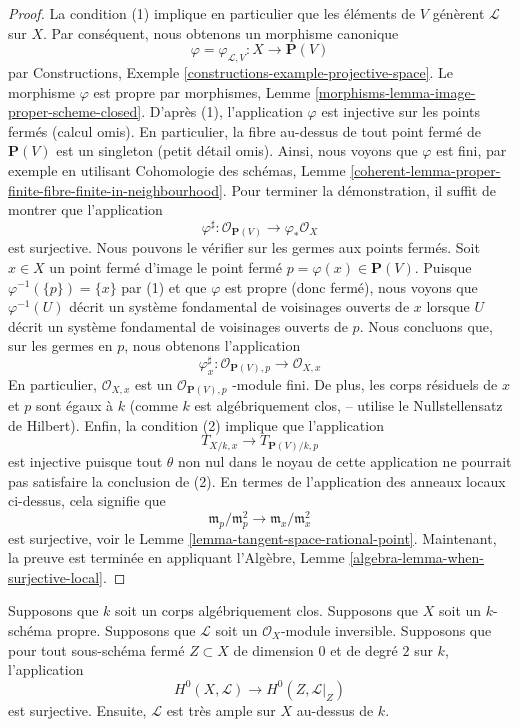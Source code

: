 \begin{proof}
La condition (1) implique en particulier que les éléments de $V$ génèrent
$\mathcal{L}$ sur $X$. Par conséquent, nous obtenons un morphisme canonique
$$
\varphi = \varphi_{\mathcal{L}, V} :
X
\longrightarrow
\mathbf{P}(V)
$$
par Constructions, Exemple
\ref{constructions-example-projective-space}. Le morphisme
$\varphi$ est propre par morphismes, Lemme
\ref{morphisms-lemma-image-proper-scheme-closed}. D'après (1),
l'application $\varphi$ est injective sur les points fermés (calcul
omis). En particulier, la fibre au-dessus de tout point fermé de
$\mathbf{P}(V)$ est un singleton (petit détail omis). Ainsi, nous voyons
que $\varphi$ est fini, par exemple en utilisant Cohomologie des
schémas, Lemme
\ref{coherent-lemma-proper-finite-fibre-finite-in-neighbourhood}. Pour terminer la démonstration, il suffit de montrer que l'application
$$
\varphi^\sharp :
\mathcal{O}_{\mathbf{P}(V)}
\longrightarrow
\varphi_*\mathcal{O}_X
$$
est surjective. Nous pouvons le vérifier sur les germes aux
points fermés. Soit $x \in X$ un point fermé d'image le point
fermé $p = \varphi(x) \in \mathbf{P}(V)$. Puisque
$\varphi^{-1}(\{p\}) = \{x\}$ par (1) et que $\varphi$ est
propre (donc fermé), nous voyons que $\varphi^{-1}(U)$ décrit un
système fondamental de voisinages ouverts de $x$ lorsque $U$
décrit un système fondamental de voisinages ouverts de $p$. Nous
concluons que, sur les germes en $p$, nous obtenons l'application
$$
\varphi^\sharp_x :
\mathcal{O}_{\mathbf{P}(V), p}
\longrightarrow
\mathcal{O}_{X, x}
$$
En particulier, $\mathcal{O}_{X, x}$ est un
$\mathcal{O}_{\mathbf{P}(V), p}$ -module fini. De plus, les
corps résiduels de $x$ et $p$ sont égaux à $k$ (comme $k$
est algébriquement clos, -- utilise le Nullstellensatz de
Hilbert). Enfin, la condition (2) implique que l'application
$$
T_{X/k, x} \longrightarrow T_{\mathbf{P}(V)/k, p}
$$
est injective puisque tout $\theta$ non nul dans le noyau de cette
application ne pourrait pas satisfaire la conclusion de (2). En
termes de l'application des anneaux locaux ci-dessus, cela signifie que
$$
\mathfrak m_p/\mathfrak m_p^2 \longrightarrow
\mathfrak m_x/\mathfrak m_x^2
$$
est surjective, voir le Lemme
\ref{lemma-tangent-space-rational-point}. Maintenant, la preuve est
terminée en appliquant l'Algèbre, Lemme \ref{algebra-lemma-when-surjective-local}.
\end{proof}

\begin{lemma}
\label{lemma-variant-separate-points-tangent-vectors}
Supposons que $k$ soit un corps algébriquement clos.
Supposons que $X$ soit un $k$-schéma propre. Supposons
que $\mathcal{L}$ soit un $\mathcal{O}_X$-module
inversible. Supposons que pour tout sous-schéma fermé $Z
\subset X$ de dimension $0$ et de degré $2$ sur $k$, l'application
$$
H^0(X, \mathcal{L}) \longrightarrow H^0(Z, \mathcal{L}|_Z)
$$
est surjective. Ensuite, $\mathcal{L}$ est très ample sur $X$ au-dessus de $k$.
\end{lemma}

